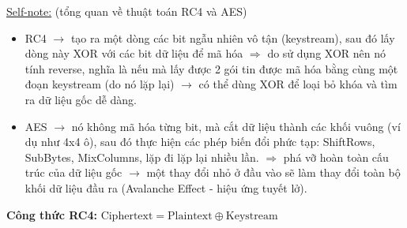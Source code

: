 \pagebreak

\noindent
\underline{Self-note:} (tổng quan về thuật toán RC4 và AES)

\begin{itemize}
    \item RC4 $\rightarrow$ tạo ra một dòng các bit ngẫu nhiên vô tận (keystream), sau đó lấy dòng này XOR với các bit dữ liệu để mã hóa $\Rightarrow$ do sử dụng XOR nên nó tính reverse, nghĩa là nếu mà lấy được 2 gói tin được mã hóa bằng cùng một đoạn keystream (do nó lặp lại) $\rightarrow$ có thể dùng XOR để loại bỏ khóa và tìm ra dữ liệu gốc dễ dàng.
    \item AES $\rightarrow$ nó không mã hóa từng bit, mà cắt dữ liệu thành các khối vuông (ví dụ như 4x4 ô), sau đó thực hiện các phép biến đổi phức tạp: ShiftRows, SubBytes, MixColumns, lặp đi lặp lại nhiều lần. $\Rightarrow$ phá vỡ hoàn toàn cấu trúc của dữ liệu gốc $\rightarrow$ một thay đổi nhỏ ở đầu vào sẽ làm thay đổi toàn bộ khối dữ liệu đầu ra (Avalanche Effect - hiệu ứng tuyết lở).
\end{itemize}

\noindent
\textbf{Công thức RC4:} $\text{Ciphertext} = \text{Plaintext} \oplus \text{Keystream}$

\pagebreak
